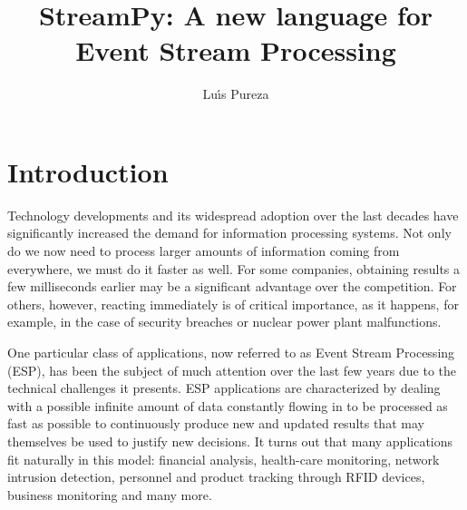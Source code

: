 \documentclass{report}
\begin{document}
\title{StreamPy: A new language for Event Stream Processing}
\author{Lu\'{\i}s Pureza}

\maketitle

\tableofcontents

\addtolength{\parskip}{\baselineskip}
\chapter{Introduction}
\label{chap:introduction}

Technology developments and its widespread adoption over the last
decades have significantly increased the demand for information
processing systems. Not only do we now need to process larger amounts
of information coming from everywhere, we must do it faster as
well. For some companies, obtaining results a few milliseconds earlier
may be a significant advantage over the competition. For others,
however, reacting immediately is of critical importance, as it
happens, for example, in the case of security breaches or nuclear
power plant malfunctions.

One particular class of applications, now referred to as Event Stream
Processing (ESP), has been the subject of much attention over the last
few years due to the technical challenges it presents. ESP
applications are characterized by dealing with a possible infinite
amount of data constantly flowing in to be processed as fast as
possible to continuously produce new and updated results that may
themselves be used to justify new decisions. It turns out that many
applications fit naturally in this model: financial analysis,
health-care monitoring, network intrusion detection, personnel and
product tracking through RFID devices, business monitoring and many
more.
\end{document}
